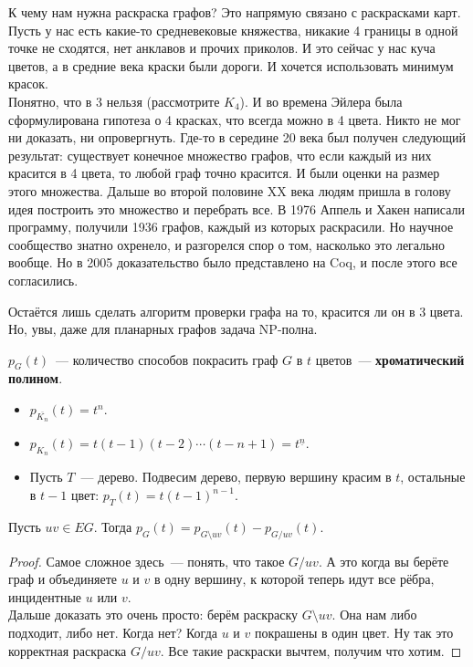 \documentclass{article}
\begin{document}
    \begin{remark}
        К чему нам нужна раскраска графов? Это напрямую связано с раскрасками карт. Пусть у нас есть какие-то средневековые княжества, никакие 4 границы в одной точке не сходятся, нет анклавов и прочих приколов. И это сейчас у нас куча цветов, а в средние века краски были дороги. И хочется использовать минимум красок.\\
        Понятно, что в 3 нельзя (рассмотрите $K_4$). И во времена Эйлера была сформулирована гипотеза о 4 красках, что всегда можно в 4 цвета. Никто не мог ни доказать, ни опровергнуть. Где-то в середине 20 века был получен следующий результат: существует конечное множество графов, что если каждый из них красится в 4 цвета, то любой граф точно красится. И были оценки на размер этого множества. Дальше во второй половине XX века людям пришла в голову идея построить это множество и перебрать все. В 1976 Аппель и Хакен написали программу, получили 1936 графов, каждый из которых раскрасили. Но научное сообщество знатно охренело, и разгорелся спор о том, насколько это легально вообще. Но в 2005 доказательство было представлено на Coq, и после этого все согласились.
    \end{remark}
    \begin{remark}
        Остаётся лишь сделать алгоритм проверки графа на то, красится ли он в 3 цвета. Но, увы, даже для планарных графов задача NP-полна.
    \end{remark}
    \begin{definition}
        $p_G(t)$~--- количество способов покрасить граф $G$ в $t$ цветов~--- \textbf{хроматический полином}.
    \end{definition}
    \begin{example}
        \begin{itemize}
            \item $p_{\overline{K_n}}(t)=t^n$.
            \item $p_{K_n}(t)=t(t-1)(t-2)\cdots(t-n+1)=t^{\underline n}$.
            \item Пусть $T$~--- дерево. Подвесим дерево, первую вершину красим в $t$, остальные в $t-1$ цвет: $p_T(t)=t(t-1)^{n-1}$.
        \end{itemize}
    \end{example}
    \begin{theorem}
        Пусть $uv\in EG$. Тогда $p_G(t)=p_{G\setminus uv}(t)-p_{G/uv}(t)$.
    \end{theorem}
    \begin{proof}
        Самое сложное здесь~--- понять, что такое $G/uv$. А это когда вы берёте граф и объединяете $u$ и $v$ в одну вершину, к которой теперь идут все рёбра, инцидентные $u$ или $v$.\\
        Дальше доказать это очень просто: берём раскраску $G\setminus uv$. Она нам либо подходит, либо нет. Когда нет? Когда $u$ и $v$ покрашены в один цвет. Ну так это корректная раскраска $G/uv$. Все такие раскраски вычтем, получим что хотим.
    \end{proof}
\end{document}
